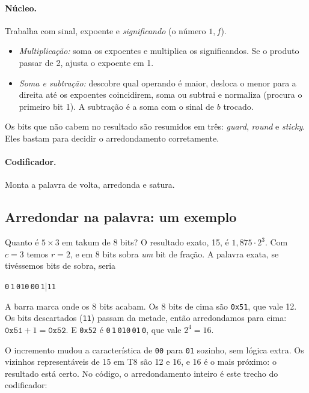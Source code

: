 \documentclass[11pt,a4paper]{article}
\newcommand{\code}[1]{\texttt{#1}}
\newcommand{\bS}[1]{\colorbox{gray!25}{\texttt{#1}}}
\newcommand{\bD}[1]{\colorbox{blue!18}{\texttt{#1}}}
\newcommand{\bR}[1]{\colorbox{blue!8}{\texttt{#1}}}
\newcommand{\bC}[1]{\colorbox{orange!25}{\texttt{#1}}}
\newcommand{\bF}[1]{\colorbox{green!18}{\texttt{#1}}}
\begin{document}
\paragraph{Núcleo.} Trabalha com sinal, expoente e \emph{significando} (o número $1{,}f$).
\begin{itemize}[nosep]
  \item \emph{Multiplicação:} soma os expoentes e multiplica os significandos. Se o produto passar de 2,
        ajusta o expoente em 1.
  \item \emph{Soma e subtração:} descobre qual operando é maior, desloca o menor para a direita até os
        expoentes coincidirem, soma ou subtrai e normaliza (procura o primeiro bit 1). A subtração é a
        soma com o sinal de $b$ trocado.
\end{itemize}
Os bits que não cabem no resultado são resumidos em três: \emph{guard}, \emph{round} e \emph{sticky}.
Eles bastam para decidir o arredondamento corretamente.

\paragraph{Codificador.} Monta a palavra de volta, arredonda e satura.

\subsection{Arredondar na palavra: um exemplo}

Quanto é $5\times3$ em takum de 8 bits? O resultado exato, 15, é $1{,}875\cdot2^3$. Com $c=3$ temos
$r=2$, e em 8 bits sobra \emph{um} bit de fração. A palavra exata, se tivéssemos bits de sobra, seria

\begin{center}
\bS{0}\,\bD{1}\,\bR{010}\,\bC{00}\,\bF{1}\;\;\Big|\;\;\bF{11}
\end{center}

A barra marca onde os 8 bits acabam. Os 8 bits de cima são \code{0x51}, que vale 12. Os bits descartados
(\code{11}) passam da metade, então arredondamos para cima: $\code{0x51}+1=\code{0x52}$. E \code{0x52} é
\bS{0}\,\bD{1}\,\bR{010}\,\bC{01}\,\bF{0}, que vale $2^4=16$.

O incremento mudou a característica de \code{00} para \code{01} sozinho, sem lógica extra. Os vizinhos
representáveis de 15 em T8 são 12 e 16, e 16 é o mais próximo: o resultado está certo. No código, o
arredondamento inteiro é este trecho do codificador:
\end{document}
